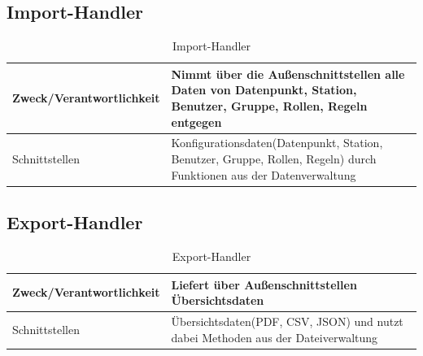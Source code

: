 \subsection{Import-Handler}
\begin{table}[th]
	\begin{tabularx}{\textwidth}{p{5cm} X}
		\hline
		Zweck/Verantwortlichkeit & Nimmt über die Außenschnittstellen alle Daten von Datenpunkt, Station, Benutzer, Gruppe, Rollen, Regeln entgegen \\
		\hline
		Schnittstellen & Konfigurationsdaten(Datenpunkt, Station, Benutzer, Gruppe, Rollen, Regeln) durch Funktionen aus der Datenverwaltung \\
		\hline
	\end{tabularx} 
	\caption{Import-Handler}
	\label{tab:Import-Handler}
\end{table}

\subsection{Export-Handler}
\begin{table}[th]
	\begin{tabularx}{\textwidth}{p{5cm} X}
		\hline
		Zweck/Verantwortlichkeit & Liefert über Außenschnittstellen Übersichtsdaten \\
		\hline
		Schnittstellen & Übersichtsdaten(PDF, CSV, JSON) und nutzt dabei Methoden aus der Dateiverwaltung\\
		\hline
	\end{tabularx} 
	\caption{Export-Handler}
	\label{tab:ExportHandler}
\end{table}
\clearpage
